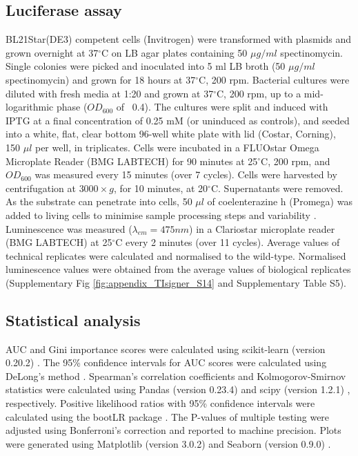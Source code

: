 \subsection{Luciferase assay}
BL21Star(DE3) competent cells (Invitrogen) were transformed with plasmids and grown overnight at 37$^{\circ}$C on LB agar plates containing 50 $\mu g/ml$ spectinomycin. Single colonies were picked and inoculated into 5 ml LB broth (50 $\mu g/ml$ spectinomycin) and grown for 18 hours at 37$^{\circ}$C, 200 rpm. Bacterial cultures were diluted with fresh media at 1:20 and grown at 37$^{\circ}$C, 200 rpm, up to a mid-logarithmic phase ($OD_{600}$ of ~0.4). The cultures were split and induced with IPTG at a final concentration of 0.25 mM (or uninduced as controls), and seeded into a white, flat, clear bottom 96-well white plate with lid (Costar, Corning), 150 $\mu l$ per well, in triplicates. Cells were incubated in a FLUOstar Omega Microplate Reader (BMG LABTECH) for 90 minutes at 25$^{\circ}$C, 200 rpm, and $OD_{600}$ was measured every 15 minutes (over 7 cycles). Cells were harvested by centrifugation at $3000 \times g$, for 10 minutes, at 20$^{\circ}$C. Supernatants were removed. As the substrate can penetrate into cells, 50 $\mu l$ of coelenterazine h (Promega) was added to living cells to minimise sample processing steps and variability \cite{Lorenz1996-kh,Fuhrmann2004-by}. Luminescence was measured ($\lambda_{em} = 475 nm$) in a Clariostar microplate reader (BMG LABTECH) at 25$^{\circ}$C every 2 minutes (over 11 cycles). Average values of technical replicates were calculated and normalised to the wild-type. Normalised luminescence values were obtained from the average values of biological replicates (Supplementary Fig \ref{fig:appendix_TIsigner_S14} and Supplementary Table S5).

\subsection{Statistical analysis}
AUC and Gini importance scores were calculated using scikit-learn (version 0.20.2) \cite{Pedregosa2011-cd}. The 95\% confidence intervals for AUC scores were calculated using DeLong’s method \cite{DeLong1988-oo}. Spearman’s correlation coefficients and Kolmogorov-Smirnov statistics were calculated using Pandas (version 0.23.4) \cite{McKinney2010-rg} and scipy (version 1.2.1) \cite{Oliphant2007-za,Millman2011-tt}, respectively. Positive likelihood ratios with 95\% confidence intervals were calculated using the bootLR package \cite{Marill2017-qb,R_Core_Team2019-kt}. The P-values of multiple testing were adjusted using Bonferroni's correction and reported to machine precision. Plots were generated using Matplotlib (version 3.0.2) \cite{Hunter2007-ii} and Seaborn (version 0.9.0) \cite{Waskom2018-dp}. 

